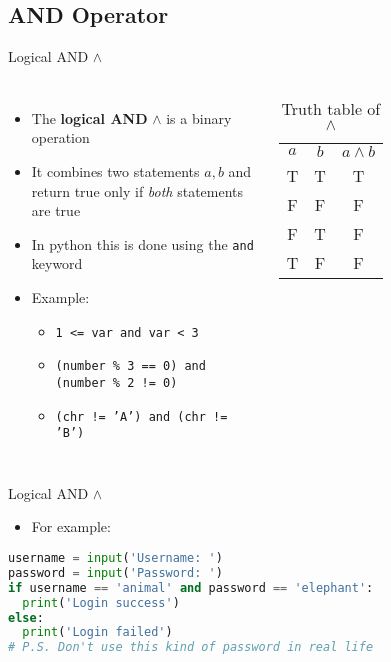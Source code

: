 \documentclass[10pt,xcolor={table,dvipsnames},t]{beamer}
\begin{document}
\subsection{AND Operator}

\begin{frame}{Logical AND $\land$}
  \begin{columns}
    \begin{itemize}
      \item The \textbf{logical AND} $\land$ is a binary operation
      \item It combines two statements $a,b$ and return true only if \textit{both} statements are true 
      \item In python this is done using the \texttt{and} keyword
      \item Example:
      \begin{itemize}
        \item \texttt{1 <= var and var < 3} 
        \item \texttt{(number \% 3 == 0)  and (number \% 2 != 0)}
        \item \texttt{(chr != 'A') and (chr != 'B')}
      \end{itemize}
    \end{itemize}
    \begin{table}[]
      \begin{tabular}{ccc}
      $a$ & $b$ & $a\land b$  \\
      T & T & T \\
      F & F & F \\
      F & T & F\\
      T & F & F
      \end{tabular}
      \caption{Truth table of $\land$}
      \end{table}
  \end{columns}
\end{frame}

\begin{frame}[fragile]{Logical AND $\land$}
  \begin{itemize}
    \item For example:
  \end{itemize}
\begin{lstlisting}[language=python]
username = input('Username: ')
password = input('Password: ')
if username == 'animal' and password == 'elephant': 
  print('Login success')
else:
  print('Login failed')
# P.S. Don't use this kind of password in real life 
\end{lstlisting}
\end{frame}
\end{document}
